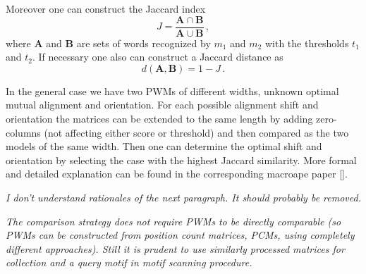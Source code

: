 Moreover one can construct the Jaccard index 
$$J = \frac{\mathbf{A}\cap \mathbf{B}}{\mathbf{A}\cup \mathbf{B}}\,, $$
where $\mathbf{A}$ and $\mathbf{B}$ are 
sets of words recognized by $m_1$ and $m_2$ with the thresholds $t_1$ and $t_2$. If necessary one also can 
construct a Jaccard distance as $$d(\mathbf{A},\mathbf{B}) = 1 - J\,.$$

In the general case we have two PWMs of different widths, unknown optimal mutual 
alignment and orientation. For each possible alignment shift and orientation the matrices can be 
extended to the same length by adding zero-columns (not affecting either score or threshold) 
and then compared as the two models of the same width. Then one can determine the optimal 
shift and orientation by selecting the case with the highest Jaccard similarity. More formal and 
detailed explanation can be found in the corresponding macroape paper [].

\emph{
I don't understand rationales of the next paragraph. It should probably be removed.}

\emph{The comparison strategy does not require PWMs to be directly comparable (so PWMs can be 
constructed from position count matrices, PCMs, using completely different approaches). Still it 
is prudent to use similarly processed matrices for collection and a query motif in motif scanning procedure. }

